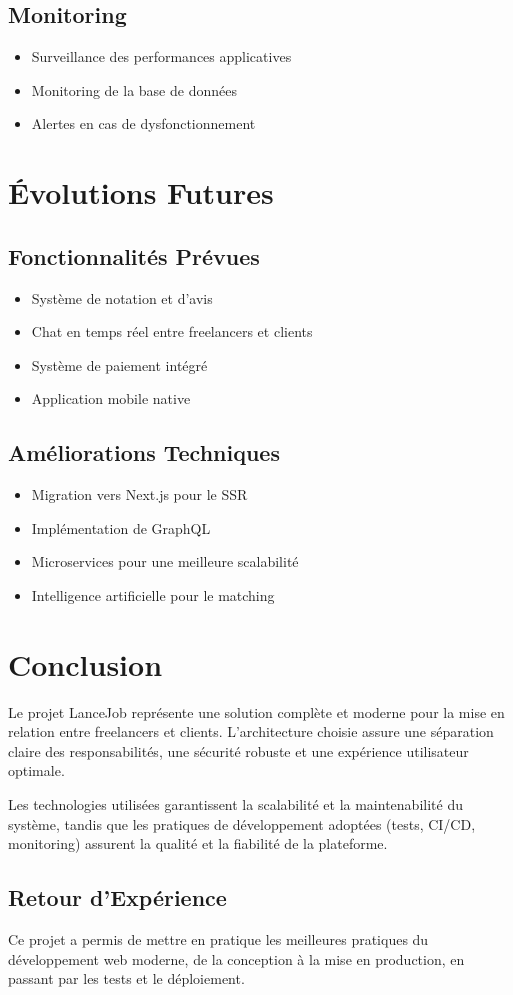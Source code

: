 \documentclass[12pt,a4paper]{article}
\begin{document}
\subsection{Monitoring}
\begin{itemize}
    \item Surveillance des performances applicatives
    \item Monitoring de la base de données
    \item Alertes en cas de dysfonctionnement
\end{itemize}

\section{Évolutions Futures}

\subsection{Fonctionnalités Prévues}
\begin{itemize}
    \item Système de notation et d'avis
    \item Chat en temps réel entre freelancers et clients
    \item Système de paiement intégré
    \item Application mobile native
\end{itemize}

\subsection{Améliorations Techniques}
\begin{itemize}
    \item Migration vers Next.js pour le SSR
    \item Implémentation de GraphQL
    \item Microservices pour une meilleure scalabilité
    \item Intelligence artificielle pour le matching
\end{itemize}

\section{Conclusion}

Le projet LanceJob représente une solution complète et moderne pour la mise en relation entre freelancers et clients. L'architecture choisie assure une séparation claire des responsabilités, une sécurité robuste et une expérience utilisateur optimale.

Les technologies utilisées garantissent la scalabilité et la maintenabilité du système, tandis que les pratiques de développement adoptées (tests, CI/CD, monitoring) assurent la qualité et la fiabilité de la plateforme.

\subsection{Retour d'Expérience}
Ce projet a permis de mettre en pratique les meilleures pratiques du développement web moderne, de la conception à la mise en production, en passant par les tests et le déploiement.
\end{document}
